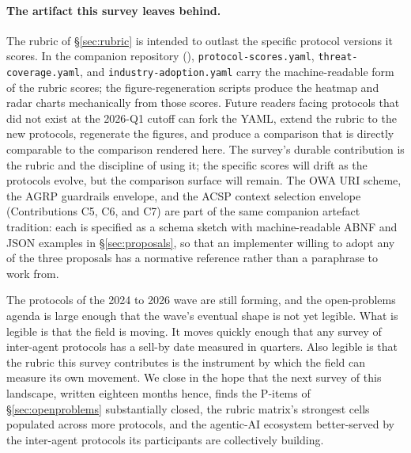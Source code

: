 \paragraph{The artifact this survey leaves behind.}
\label{sec:conclusion:artifact}
The rubric of \S\ref{sec:rubric} is intended to
outlast the specific protocol versions it scores.
In the companion repository
(\companionrepo),
\texttt{protocol-scores.yaml},
\texttt{threat-coverage.yaml}, and
\texttt{industry-adoption.yaml} carry the
machine-readable form of the rubric scores; the
figure-regeneration scripts produce the heatmap and
radar charts mechanically from those scores.
Future readers facing protocols that did not exist
at the 2026-Q1 cutoff can fork the YAML, extend the
rubric to the new protocols, regenerate the figures,
and produce a comparison that is directly comparable
to the comparison rendered here. The survey's
durable contribution is the rubric and the
discipline of using it; the specific scores will
drift as the protocols evolve, but the comparison
surface will remain. The OWA URI scheme, the AGRP
guardrails envelope, and the ACSP context selection
envelope (Contributions C5, C6, and C7) are part of
the same companion artefact tradition: each is
specified as a schema sketch with machine-readable
ABNF and JSON examples in \S\ref{sec:proposals}, so
that an implementer willing to adopt any of the
three proposals has a normative reference rather
than a paraphrase to work from.

The protocols of the 2024 to 2026 wave are still
forming, and the open-problems agenda is large
enough that the wave's eventual shape is not yet
legible. What is legible is that the field is
moving. It moves quickly enough that any survey of
inter-agent protocols has a sell-by date measured
in quarters. Also legible is that the rubric this survey
contributes is the instrument by which the field
can measure its own movement. We close in the
hope that the next survey of this landscape,
written eighteen months hence, finds the
P-items of \S\ref{sec:openproblems} substantially
closed, the rubric matrix's strongest cells
populated across more protocols, and the
agentic-AI ecosystem better-served by the
inter-agent protocols its participants are
collectively building.


